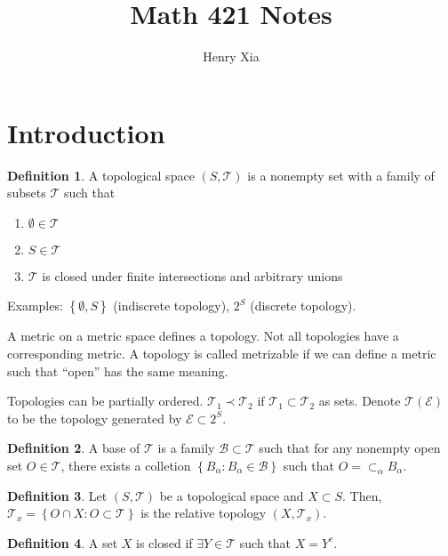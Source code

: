 \documentclass[11pt]{article}
\title{Math 421 Notes}
\author{Henry Xia}
\theoremstyle{definition}
\newtheorem{defn}{Definition}[section]
\newcommand{\set}[1]{\left\{ #1 \right\}}
\newcommand{\m}[1]{\mathcal{#1}}
\begin{document}
\maketitle

\tableofcontents


\section{Introduction}

\begin{defn} A topological space $(S,\m{T})$ is a nonempty set with a family of subsets
$\m{T}$ such that
\begin{enumerate}
  \item $\emptyset\in\m{T}$
  \item $S\in\m{T}$
  \item $\m{T}$ is closed under finite intersections and arbitrary unions
\end{enumerate}
\end{defn}

Examples: $\set{\emptyset,S}$ (indiscrete topology), $2^S$ (discrete topology).

A metric on a metric space defines a topology. Not all topologies have a corresponding
metric. A topology is called metrizable if we can define a metric such that ``open'' has
the same meaning.

Topologies can be partially ordered. $\m{T}_1\prec\m{T}_2$ if $\m{T}_1\subset\m{T}_2$ as
sets. Denote $\m{T}(\m{E})$ to be the topology generated by $\m{E}\subset 2^S$.

\begin{defn}
A base of $\m{T}$ is a family $\m{B}\subset\m{T}$ such that for any nonempty open set
$O\in\m{T}$, there exists a colletion $\set{B_\alpha:B_\alpha\in\m{B}}$ such that
$O=\subset_\alpha B_\alpha$.
\end{defn}

\begin{defn}
Let $(S,\m{T})$ be a topological space and $X\subset S$. Then, $\m{T}_x=\set{O\cap X:
O\subset\m{T}}$ is the relative topology $(X,\m{T}_x)$.
\end{defn}

\begin{defn}
A set $X$ is closed if $\exists Y\in\m{T}$ such that $X=Y^c$.
\end{defn}
\end{document}

